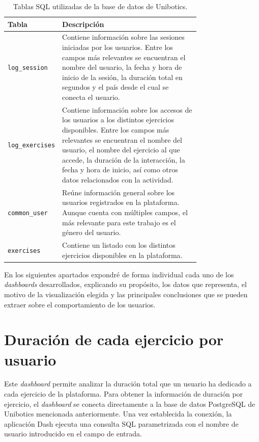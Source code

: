 \documentclass[a4paper, 12pt]{book}
\begin{document}
\begin{table}[!htb]
\centering
\caption{Tablas SQL utilizadas de la base de datos de Unibotics.}
\label{tbl:sql-tables}
\begin{tabular}{lp{0.75\linewidth}}
\toprule
\textbf{Tabla} & \textbf{Descripción} \\
\midrule
\texttt{log\_session} & Contiene información sobre las sesiones iniciadas por los usuarios. Entre los campos más relevantes se encuentran el nombre del usuario, la fecha y hora de inicio de la sesión, la duración total en segundos y el país desde el cual se conecta el usuario. \\
\texttt{log\_exercises} & Contiene información sobre los accesos de los usuarios a los distintos ejercicios disponibles. Entre los campos más relevantes se encuentran el nombre del usuario, el nombre del ejercicio al que accede, la duración de la interacción, la fecha y hora de inicio, así como otros datos relacionados con la actividad. \\
\texttt{common\_user} & Reúne información general sobre los usuarios registrados en la plataforma. Aunque cuenta con múltiples campos, el más relevante para este trabajo es el género del usuario. \\
\texttt{exercises} & Contiene un listado con los distintos ejercicios disponibles en la plataforma. \\
\bottomrule
\end{tabular}
\vspace{1ex}
\end{table}

En los siguientes apartados expondré de forma individual cada uno de los \textit{dashboards} desarrollados, explicando su propósito, los datos que representa, el motivo de la visualización elegida y las principales conclusiones que se pueden extraer sobre el comportamiento de los usuarios.

\section{Duración de cada ejercicio por usuario}
\label{sec:dash1a}

Este \textit{dashboard} permite analizar la duración total que un usuario ha dedicado a cada ejercicio de la plataforma.
Para obtener la información de duración por ejercicio, el \textit{dashboard} se conecta directamente a la base de datos PostgreSQL de Unibotics mencionada anteriormente. Una vez establecida la conexión, la aplicación Dash ejecuta una consulta SQL parametrizada con el nombre de usuario introducido en el campo de entrada.
\end{document}
